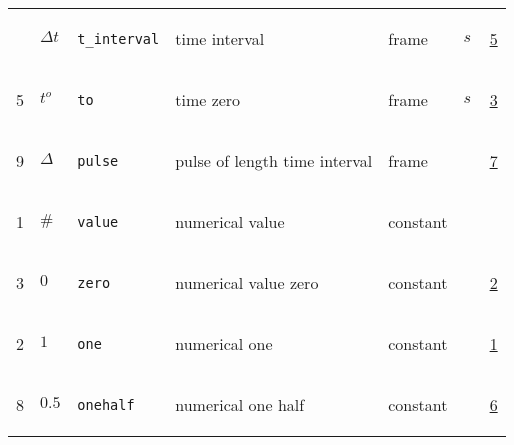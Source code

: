 \begin{longtable}{|p{1cm}|p{2.5cm}|p{4.5cm}|p{8cm}|p{3.0cm}|p{3cm}|p{1cm}|}
             & \hypertarget{"v:7"}{ $ {{\Delta t}}{_{}} $}
             & \verb|t_interval|
             & time interval
             & \begin{lay}frame \end{lay}
             & $ s \, $
             &                 \hyperlink{"e:5"}{ 5 }
                 \\
            5
             & \hypertarget{"v:5"}{ $ {{t^o}}{_{}} $}
             & \verb|to|
             & time zero
             & \begin{lay}frame \end{lay}
             & $ s \, $
             &                 \hyperlink{"e:3"}{ 3 }
                 \\
            9
             & \hypertarget{"v:9"}{ $ {{\Delta}}{_{}} $}
             & \verb|pulse|
             & pulse of length time interval
             & \begin{lay}frame \end{lay}
             & $  $
             &                 \hyperlink{"e:7"}{ 7 }
                 \\
            1
             & \hypertarget{"v:1"}{ $ {{\#}}{_{}} $}
             & \verb|value|
             & numerical value
             & \begin{lay}constant \end{lay}
             & $  $
             & \\
            3
             & \hypertarget{"v:3"}{ $ {0}{_{}} $}
             & \verb|zero|
             & numerical value zero
             & \begin{lay}constant \end{lay}
             & $  $
             &                 \hyperlink{"e:2"}{ 2 }
                 \\
            2
             & \hypertarget{"v:2"}{ $ {1}{_{}} $}
             & \verb|one|
             & numerical one
             & \begin{lay}constant \end{lay}
             & $  $
             &                 \hyperlink{"e:1"}{ 1 }
                 \\
            8
             & \hypertarget{"v:8"}{ $ {0.5}{_{}} $}
             & \verb|onehalf|
             & numerical one half
             & \begin{lay}constant \end{lay}
             & $  $
             &                 \hyperlink{"e:6"}{ 6 }
                 \\
    \end{longtable}